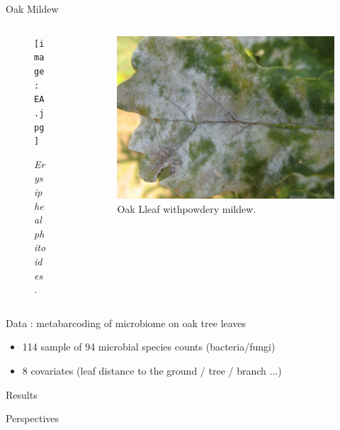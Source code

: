 \documentclass{beamer}
\begin{document}
\begin{frame}{Oak Mildew}
\begin{columns}
\begin{column}{5cm}
\begin{figure}[htp]
\centering
\texttt{[image: EA.jpg]}
\caption{\textit{Erysiphe alphitoides.}}
\end{figure}
\end{column}
\begin{column}{6cm}
\begin{figure}[htp]
\centering
\includegraphics[scale=0.1]{mildew.jpg}
\caption{Oak Lleaf withpowdery mildew.}
\end{figure}
\end{column}
\end{columns}
\vspace{0.5cm}
Data : metabarcoding of microbiome on oak tree leaves 
\begin{itemize}
	\item 114 sample of 94 microbial species counts (bacteria/fungi)
	\item 8 covariates (leaf distance to the ground / tree / branch ...)
\end{itemize}
\end{frame}
\begin{frame}{Results}
	
\end{frame}
\begin{frame}{Perspectives}
	
\end{frame}
\end{document}
